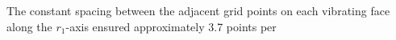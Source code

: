 %
The constant spacing between
the adjacent grid points on
each vibrating face along
the $r_{1}$-axis ensured
approximately \num{3.7} points per
